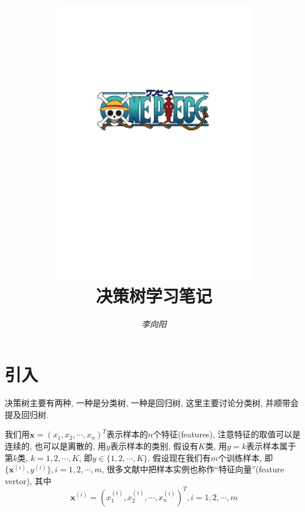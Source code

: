 \documentclass[a4paper,UTF8]{ctexart}
\theoremstyle{plain} \newtheorem{theorem}{定理}[section]
\theoremstyle{plain} \newtheorem{definition}{定义}[section]
\theoremstyle{plain} \newtheorem{lemma}{引理}[section]
\theoremstyle{plain} \newtheorem{proposition}{命题}[section]
\theoremstyle{plain} \newtheorem{example}{例}
\theoremstyle{plain} \newtheorem{remark}{注}
\theoremstyle{plain} \newtheorem{corollary}{推论}[section]
\begin{document}
\title{
\includegraphics[width=0.65\textwidth]{onepiece.pdf}\\
\vspace{2em}
\textbf{决策树学习笔记}}
\author{\emph{李向阳} 
}
\date{}


\maketitle
\thispagestyle{empty}

\newpage


\tableofcontents

\newpage

\section{引入}
决策树主要有两种, 一种是分类树, 一种是回归树, 这里主要讨论分类树, 并顺带会提及回归树.

我们用$\bm{x} = (x_{1}, x_{2}, \cdots, x_{n})^{T}$表示样本的$n$个特征(features), 注意特征的取值可以是连续的, 也可以是离散的, 用$y$表示样本的类别, 假设有$K$类, 用$y = k$表示样本属于第$k$类, $k = 1, 2, \cdots, K$, 即$y \in \{ 1, 2, \cdots, K \}$. 假设现在我们有$m$个训练样本, 即$\{\bm{x}^{(i)}, y^{(i)}\}, i = 1, 2, \cdots, m$, 很多文献中把样本实例也称作“特征向量”(feature vertor), 其中
\begin{equation*}
\bm{x}^{(i)} = (x_{1}^{(i)}, x_{2}^{(i)}, \cdots, x_{n}^{(i)})^{T},i = 1, 2, \cdots, m
\end{equation*}
\end{document}
